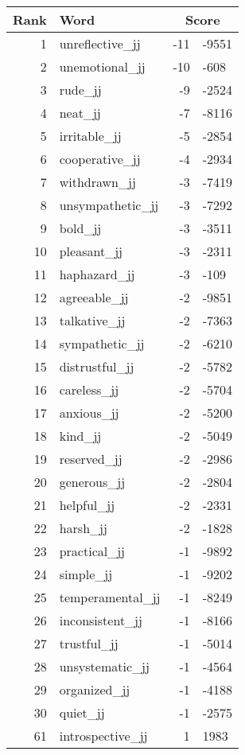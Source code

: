 \begin{longtable}[!htbp]{| rlr@{.}l |}
    \hline
    \textbf{Rank} & \textbf{Word} & \multicolumn{2}{c|}{\textbf{Score}} \\
    \hline
    \endhead
    1 & unreflective\_jj & -11 & -9551 \\
    2 & unemotional\_jj & -10 & -608 \\
    3 & rude\_jj & -9 & -2524 \\
    4 & neat\_jj & -7 & -8116 \\
    5 & irritable\_jj & -5 & -2854 \\
    6 & cooperative\_jj & -4 & -2934 \\
    7 & withdrawn\_jj & -3 & -7419 \\
    8 & unsympathetic\_jj & -3 & -7292 \\
    9 & bold\_jj & -3 & -3511 \\
    10 & pleasant\_jj & -3 & -2311 \\
    11 & haphazard\_jj & -3 & -109 \\
    12 & agreeable\_jj & -2 & -9851 \\
    13 & talkative\_jj & -2 & -7363 \\
    14 & sympathetic\_jj & -2 & -6210 \\
    15 & distrustful\_jj & -2 & -5782 \\
    16 & careless\_jj & -2 & -5704 \\
    17 & anxious\_jj & -2 & -5200 \\
    18 & kind\_jj & -2 & -5049 \\
    19 & reserved\_jj & -2 & -2986 \\
    20 & generous\_jj & -2 & -2804 \\
    21 & helpful\_jj & -2 & -2331 \\
    22 & harsh\_jj & -2 & -1828 \\
    23 & practical\_jj & -1 & -9892 \\
    24 & simple\_jj & -1 & -9202 \\
    25 & temperamental\_jj & -1 & -8249 \\
    26 & inconsistent\_jj & -1 & -8166 \\
    27 & trustful\_jj & -1 & -5014 \\
    28 & unsystematic\_jj & -1 & -4564 \\
    29 & organized\_jj & -1 & -4188 \\
    30 & quiet\_jj & -1 & -2575 \\
    61 & introspective\_jj & 1 & 1983 \\

\end{longtable}
